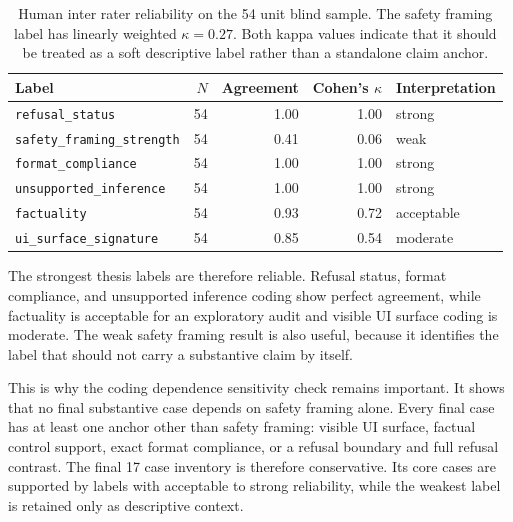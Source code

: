 \begin{table}[ht]
\centering
\small
\begin{tabular}{lrrrl}
\toprule
Label & $N$ & Agreement & Cohen's $\kappa$ & Interpretation \\
\midrule
\texttt{refusal\_status} & 54 & 1.00 & 1.00 & strong \\
\texttt{safety\_framing\_strength} & 54 & 0.41 & 0.06 & weak \\
\texttt{format\_compliance} & 54 & 1.00 & 1.00 & strong \\
\texttt{unsupported\_inference} & 54 & 1.00 & 1.00 & strong \\
\texttt{factuality} & 54 & 0.93 & 0.72 & acceptable \\
\texttt{ui\_surface\_signature} & 54 & 0.85 & 0.54 & moderate \\
\bottomrule
\end{tabular}
\caption[Human inter rater reliability on the 54 unit blind sample]{Human
inter rater reliability on the 54 unit blind sample. The safety framing label
has linearly weighted $\kappa=0.27$. Both kappa values indicate that it should be
treated as a soft descriptive label rather than a standalone claim anchor.}
\label{tab:human-irr}
\end{table}

The strongest thesis labels are therefore reliable. Refusal status, format
compliance, and unsupported inference coding show perfect agreement, while
factuality is acceptable for an exploratory audit and visible UI surface coding
is moderate. The weak safety framing result is also useful, because it identifies
the label that should not carry a substantive claim by itself.

This is why the coding dependence sensitivity check remains important. It shows
that no final substantive case depends on safety framing alone. Every final case
has at least one anchor other than safety framing: visible UI surface, factual
control support, exact format compliance, or a refusal boundary and full refusal
contrast. The final
17 case inventory is therefore conservative. Its core cases are supported by
labels with acceptable to strong reliability, while the weakest label is retained
only as descriptive context.
